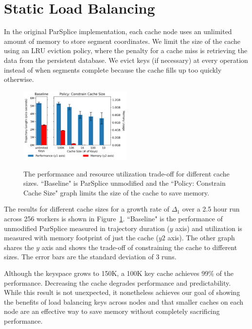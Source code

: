 \section{Static Load Balancing}
\label{sec:static-load-balancing}

In the original ParSplice implementation, each cache node uses an unlimited
amount of memory to store segment coordinates. We limit the size of the cache
using an LRU eviction policy, where the penalty for a cache miss is retrieving
the data from the persistent database.  We evict keys (if necessary) at every
operation instead of when segments complete because the cache fills up too
quickly otherwise.

\begin{figure}[t]
  \noindent\includegraphics[width=0.5\textwidth]{figures/methodology-tradeoff.png}\\

  \caption{The performance and resource utilization trade-off for different
cache sizes. ``Baseline" is
ParSplice unmodified and the ``Policy: Constrain Cache Size" graph limits the
size of the cache to save memory.  \label{fig:methodology-tradeoff}}

\end{figure}

The results for different cache sizes for a growth rate of \(\Delta_1\) over a
2.5 hour run across 256 workers is shown in
Figure~\ref{fig:methodology-tradeoff}.  ``Baseline" is the performance of
unmodified ParSplice  measured in trajectory duration (\(y\) axis) and
utilization is measured with memory footprint of just the cache (\(y2\) axis).
The other graph shares the \(y\) axis and shows the trade-off of constraining
the cache to different sizes.  The error bars are the standard deviation of 3
runs. 

Although the keyspace grows to 150K, a 100K key cache achieves 99\% of the
performance. Decreasing the cache degrades performance and predictability.
While this result is not unexpected, it nonetheless achieves our goal of
showing the benefits of load balancing keys across nodes and that smaller
caches on each node are an effective way to save memory without completely
sacrificing performance.
